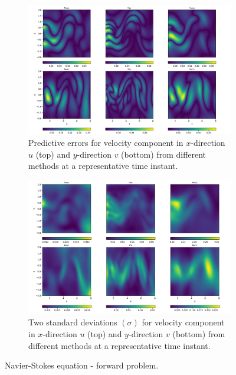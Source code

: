 \documentclass{article}
\begin{document}
\begin{figure}
    \centering
    \vspace{-20mm}
    \begin{subfigure}[b]{\linewidth}
        \includegraphics[width=\linewidth, keepaspectratio]{images/1.png}
        \caption{Predictive errors for velocity component in $x$-direction $u$ (top) and $y$-direction $v$ (bottom) from different methods at a representative time instant.}
        \label{fig:navier-stokes-error}
    \end{subfigure}
    \vspace{1em} %
    \begin{subfigure}[b]{\linewidth}
        \includegraphics[width=\linewidth, keepaspectratio]{images/2.png}
        \caption{Two standard deviations $(\sigma)$ for velocity component in $x$-direction $u$ (top) and $y$-direction $v$ (bottom) from different methods at a representative time instant.}
        \label{fig:navier-stokes-sigma}
    \end{subfigure}
    \caption{Navier-Stokes equation - forward problem.}
\end{figure}
\end{document}
